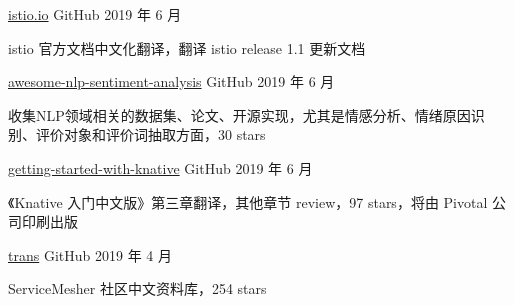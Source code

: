 

\begin{cventries}

  \cventry
    {} %
    {\href{https://github.com/istio/istio.io}{istio.io}} %
    {GitHub} %
    {2019 年 6 月} %
    {
      \begin{cvitems} %
        \item istio 官方文档中文化翻译，翻译 istio release 1.1 更新文档
      \end{cvitems}
    }

  \cventry
    {} %
    {\href{haiker2011/awesome-nlp-sentiment-analysis}{awesome-nlp-sentiment-analysis}} %
    {GitHub} %
    {2019 年 6 月} %
    {
      \begin{cvitems} %
        \item 收集NLP领域相关的数据集、论文、开源实现，尤其是情感分析、情绪原因识别、评价对象和评价词抽取方面，30 stars
      \end{cvitems}
    }

  \cventry
    {} %
    {\href{https://github.com/servicemesher/getting-started-with-knative}{getting-started-with-knative}} %
    {GitHub} %
    {2019 年 6 月} %
    {
      \begin{cvitems} %
        \item 《Knative 入门中文版》第三章翻译，其他章节 review，97 stars，将由 Pivotal 公司印刷出版
      \end{cvitems}
    }

  \cventry
    {} %
    {\href{https://github.com/servicemesher/trans}{trans}} %
    {GitHub} %
    {2019 年 4 月} %
    {
      \begin{cvitems} %
        \item ServiceMesher 社区中文资料库，254 stars
      \end{cvitems}
    }



\end{cventries}
